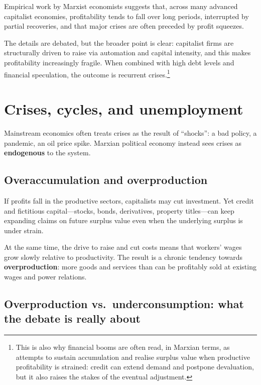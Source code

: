 Empirical work by Marxist economists suggests that, across many advanced
capitalist economies, profitability tends to fall over long periods, interrupted
by partial recoveries, and that major crises are often preceded by profit
squeezes.\cite{Roberts2015,Shaikh2016}

The details are debated, but the broader point is clear: capitalist firms
are structurally driven to raise \OCC{} via automation and capital intensity,
and this makes profitability increasingly fragile. When combined with high
debt levels and financial speculation, the outcome is recurrent crises.\footnote{This is also why financial booms are often read, in Marxian terms, as attempts to sustain accumulation and realise surplus value when productive profitability is strained: credit can extend demand and postpone devaluation, but it also raises the stakes of the eventual adjustment.}

\section{Crises, cycles, and unemployment}
\label{sec:crises}

Mainstream economics often treats crises as the result of ``shocks'': a bad
policy, a pandemic, an oil price spike. Marxian political economy instead
sees crises as \textbf{endogenous} to the system.

\subsection{Overaccumulation and overproduction}

If profits fall in the productive sectors, capitalists may cut investment.
Yet credit and fictitious capital---stocks, bonds, derivatives, property
titles---can keep expanding claims on future surplus value even when the
underlying surplus is under strain.\cite{HarveyNewImperialism}

At the same time, the drive to raise \exploitrate{} and cut costs means that
workers' wages grow slowly relative to productivity. The result is a chronic
tendency towards \textbf{overproduction}: more goods and services than can
be profitably sold at existing wages and power relations.


\subsection{Overproduction vs.\ underconsumption: what the debate is really about}
\label{sec:overproduction-underconsumption}

